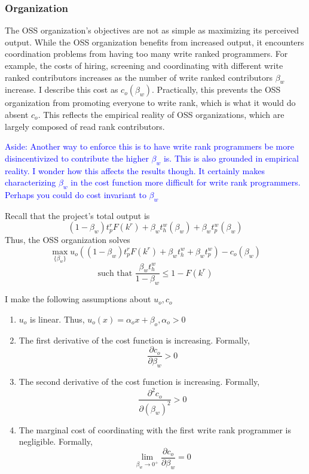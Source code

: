 \documentclass[12pt,notitlepage]{article}
\begin{document}
\subsubsection{Organization}
The OSS organization's objectives are not as simple as maximizing its perceived output. While the OSS organization benefits from increased output, it encounters coordination problems from having too many write ranked programmers. For example, the costs of hiring, screening and coordinating with different write ranked contributors increases as the number of write ranked contributors $\beta_w$ increase. I describe this cost as $c_o(\beta_w)$. Practically, this prevents the OSS organization from promoting everyone to write rank, which is what it would do absent $c_o$. This reflects the empirical reality of OSS organizations, which are largely composed of read rank contributors. 

\textcolor{blue}{Aside: Another way to enforce this is to have write rank programmers be more disincentivized to contribute the higher $\beta_w$ is. This is also grounded in empirical reality. I wonder how this affects the results though. It certainly makes characterizing $\beta_w$ in the cost function more difficult for write rank programmers. Perhaps you could do cost invariant to $\beta_w$}

\qquad Recall that the project's total output is 
$$(1-\beta_w) t_p^r F(k^r) + \beta_w t_h^w(\beta_w) + \beta_w t_p^w(\beta_w)$$
Thus, the OSS organization solves
$$\max_{\{\beta_w\}} u_o\left((1-\beta_w) t_p^r F(k^r) + \beta_w t_h^w + \beta_w t_p^w\right) - c_o(\beta_w)$$ 
$$\text{such that }\frac{\beta_w t_h^w}{1-\beta_w} \leq 1-F(k^r)$$

I make the following assumptions about $u_o, c_o$
\begin{enumerate}
    \item $u_o$ is linear. Thus, $u_o(x) = \alpha_ox + \beta_o, \alpha_o > 0$
    \item The first derivative of the cost function is increasing. Formally, 
    $$\frac{\partial c_o}{\partial \beta_w}>0$$
    \item  The second derivative of the cost function is increasing. Formally, $$\frac{\partial^2 c_o}{\partial (\beta_w)^2}>0$$
    \item The marginal cost of coordinating with the first write rank programmer is negligible. Formally,
    $$\lim_{\beta_w \to 0^+} \frac{\partial c_o}{\partial \beta_w} = 0 $$
\end{enumerate}
\end{document}
